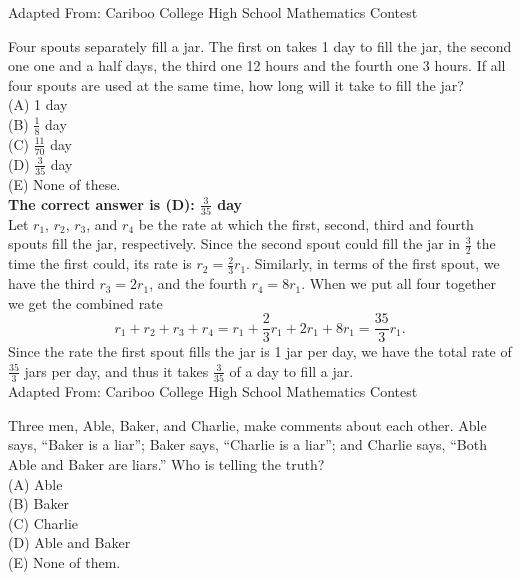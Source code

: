 \documentclass{article}
\begin{document}
\scriptsize
Adapted From: Cariboo College High School Mathematics Contest

\normalsize
Four spouts separately fill a jar.  The first on takes 1 day to fill the jar, the second one one and a half days, the third one 12 hours and the fourth one 3 hours.  If all four spouts are used at the same time, how long will it take to fill the jar?\\
(A) 1 day\\
(B) $\frac{1}{8}$ day\\
(C) $\frac{11}{70}$ day\\
(D) $\frac{3}{35}$ day\\
(E) None of these.\\


\textbf{The correct answer is (D): $\frac{3}{35}$ day}\\[1 ex]
Let $r_{1}$, $r_{2}$, $r_{3}$, and $r_{4}$ be the rate at which the first, second, third and fourth spouts fill the jar, respectively. Since the second spout could fill the jar in $\frac{3}{2}$ the time the first could, its rate is $r_{2}=\frac{2}{3}r_{1}$. Similarly, in terms of the first spout, we have the third $r_{3}=2r_{1}$, and the fourth $r_{4}=8r_{1}$.  When we put all four together we get the combined rate
\begin{equation*}
r_{1}+r_{2}+r_{3}+r_{4}=r_{1}+\frac{2}{3}r_{1}+2r_{1}+8r_{1}=\frac{35}{3}r_1.
\end{equation*}
Since the rate the first spout fills the jar is 1 jar per day, we have the total rate of $\frac{35}{3}$ jars per day, and thus it takes $\frac{3}{35}$ of a day to fill a jar.
\\[5 ex]

\scriptsize
Adapted From: Cariboo College High School Mathematics Contest

\normalsize
Three men, Able, Baker, and Charlie, make comments about each other. Able says, ``Baker is a liar''; Baker says, ``Charlie is a liar''; and Charlie says, ``Both Able and Baker are liars.'' Who is telling the truth?\\
(A) Able\\
(B) Baker\\
(C) Charlie\\
(D) Able and Baker\\
(E) None of them.\\
\end{document}
